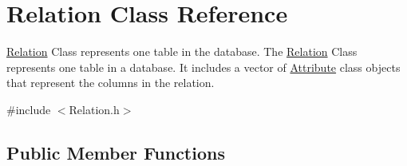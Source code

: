 \hypertarget{class_relation}{\section{Relation Class Reference}
\label{class_relation}
}


\hyperlink{class_relation}{Relation} Class represents one table in the database. The \hyperlink{class_relation}{Relation} Class represents one table in a database. It includes a vector of \hyperlink{class_attribute}{Attribute} class objects that represent the columns in the relation.  




{\ttfamily \#include $<$Relation.\-h$>$}

\subsection*{Public Member Functions}
